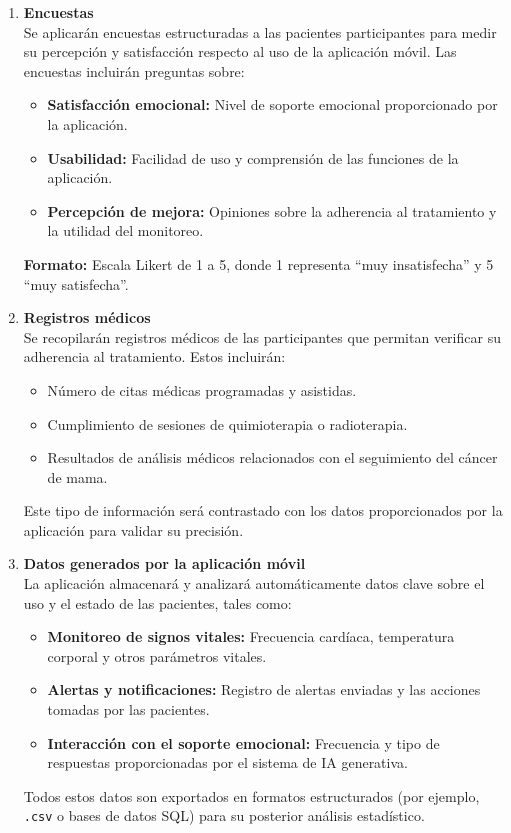 \begin{enumerate}
    \item \textbf{Encuestas}\\
    Se aplicarán encuestas estructuradas a las pacientes participantes para medir su percepción y satisfacción respecto al uso de la aplicación móvil. Las encuestas incluirán preguntas sobre:
    \begin{itemize}
        \item \textbf{Satisfacción emocional:} Nivel de soporte emocional proporcionado por la aplicación.
        \item \textbf{Usabilidad:} Facilidad de uso y comprensión de las funciones de la aplicación.
        \item \textbf{Percepción de mejora:} Opiniones sobre la adherencia al tratamiento y la utilidad del monitoreo.
    \end{itemize}
    \textbf{Formato:} Escala Likert de 1 a 5, donde 1 representa ``muy insatisfecha'' y 5 ``muy satisfecha''.
    
    \item \textbf{Registros médicos}\\
    Se recopilarán registros médicos de las participantes que permitan verificar su adherencia al tratamiento. Estos incluirán:
    \begin{itemize}
        \item Número de citas médicas programadas y asistidas.
        \item Cumplimiento de sesiones de quimioterapia o radioterapia.
        \item Resultados de análisis médicos relacionados con el seguimiento del cáncer de mama.
    \end{itemize}
    Este tipo de información será contrastado con los datos proporcionados por la aplicación para validar su precisión.
    
    \item \textbf{Datos generados por la aplicación móvil}\\
    La aplicación almacenará y analizará automáticamente datos clave sobre el uso y el estado de las pacientes, tales como:
    \begin{itemize}
        \item \textbf{Monitoreo de signos vitales:} Frecuencia cardíaca, temperatura corporal y otros parámetros vitales.
        \item \textbf{Alertas y notificaciones:} Registro de alertas enviadas y las acciones tomadas por las pacientes.
        \item \textbf{Interacción con el soporte emocional:} Frecuencia y tipo de respuestas proporcionadas por el sistema de IA generativa.
    \end{itemize}
    Todos estos datos son exportados en formatos estructurados (por ejemplo, \texttt{.csv} o bases de datos SQL) para su posterior análisis estadístico.
\end{enumerate}

